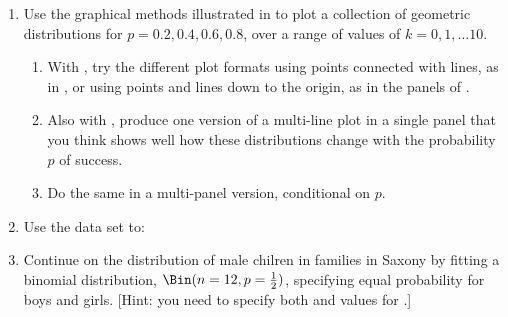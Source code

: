 \documentclass[11pt]{book}\usepackage[]{graphicx}\usepackage[]{color}
\begin{document}
\begin{enumerate}
  \item Use the graphical methods illustrated in 
  to plot a collection of geometric distributions for $p = 0.2, 0.4, 0.6, 0.8$,
  over a range of values of $k = 0, 1, \dots 10$.
  \begin{enumerate}
    \item With , try the different plot formats using points
    connected with lines, as in , or using points
    and lines down to the origin, as in the panels of .
    \item Also with , produce one version of a multi-line plot
    in a single panel that you think shows well how these distributions change
    with the probability $p$ of success.
    \item Do the same in a multi-panel version, conditional on $p$.
  \end{enumerate}
  
  \item Use the data set  to:
  
  \item Continue  on the distribution of male chilren in families
  in Saxony by fitting a binomial distribution, $\Bin(n=12, p=\frac12)$, specifying
  equal probability for boys and girls. [Hint:  you need to specify both  and
   values for .]


\end{enumerate}
\end{document}
